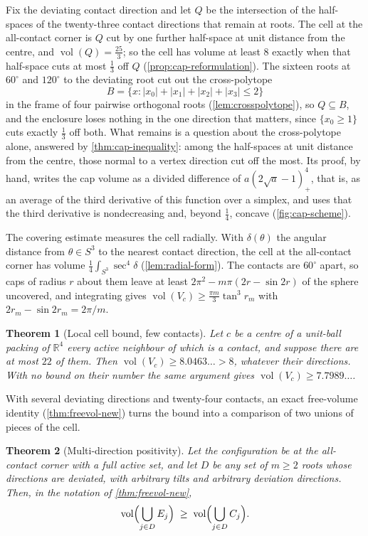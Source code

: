 \documentclass[11pt,reqno]{amsart}
\renewcommand{\_}{\origunderscore\allowbreak}
\numberwithin{equation}{section}
\theoremstyle{plain}
\newtheorem{thm}{Theorem}[section]
\theoremstyle{definition}
\theoremstyle{remark}
\DeclareMathOperator{\vol}{vol}
\begin{document}
Fix the deviating contact direction and let $Q$ be the intersection of
the half-spaces of the twenty-three contact directions that remain at
roots. The cell at the all-contact corner is $Q$ cut by one further
half-space at unit distance from the centre, and $\vol(Q)=\frac{25}{3}$;
so the cell has volume at least $8$ exactly when that half-space cuts at
most $\frac13$ off $Q$ (\cref{prop:cap-reformulation}). The sixteen roots
at $60^\circ$ and $120^\circ$ to the deviating root cut out the
cross-polytope
\[
  B=\bigl\{x : |x_0|+|x_1|+|x_2|+|x_3|\le2\bigr\}
\]
in the frame of four pairwise orthogonal roots (\cref{lem:crosspolytope}),
so $Q\subseteq B$, and the enclosure loses nothing in the one direction
that matters, since $\{x_0\ge1\}$ cuts exactly $\frac13$ off both. What
remains is a question about the cross-polytope alone, answered by
\cref{thm:cap-inequality}: among the half-spaces at unit distance from the
centre, those normal to a vertex direction cut off the most. Its proof,
by hand, writes the cap volume as a divided difference of
$a(2\sqrt a-1)_+^4$, that is, as an average of the third derivative of
this function over a simplex, and uses that the third derivative is
nondecreasing and, beyond $\frac14$, concave (\cref{fig:cap-scheme}).

The covering estimate measures the cell radially. With $\delta(\theta)$ the
angular distance from $\theta\in S^3$ to the nearest contact direction, the
cell at the all-contact corner has volume
$\frac14\int_{S^3}\sec^4\delta$ (\cref{lem:radial-form}). The contacts are
$60^\circ$ apart, so caps of radius $r$ about them leave at least
$2\pi^2-m\pi(2r-\sin2r)$ of the sphere uncovered, and integrating gives
$\vol(V_c)\ge\frac{\pi m}{3}\tan^3r_m$ with $2r_m-\sin2r_m=2\pi/m$.

\begin{thm}[Local cell bound, few contacts]\label{thm:local-fewcontacts}
Let $c$ be a centre of a unit-ball packing of $\mathbb{R}^4$ every active
neighbour of which is a contact, and suppose there are at most $22$ of
them. Then $\vol(V_c)\ge8.0463\ldots>8$, whatever their directions. With
no bound on their number the same argument gives $\vol(V_c)\ge7.7989\ldots$.
\end{thm}

With several deviating directions and twenty-four contacts, an exact
free-volume identity (\cref{thm:freevol-new}) turns the bound into a
comparison of two unions of pieces of the cell.

\begin{thm}[Multi-direction positivity]\label{conj:multidir-new}
Let the configuration be at the all-contact corner with a full active
set, and let $D$ be any set of $m\ge2$ roots whose directions are
deviated, with arbitrary tilts and arbitrary deviation directions. Then,
in the notation of \cref{thm:freevol-new},
\[
  \vol\Bigl(\bigcup_{j\in D}E_j\Bigr)
  \;\ge\;
  \vol\Bigl(\bigcup_{j\in D}C_j\Bigr).
\]
\end{thm}
\end{document}
